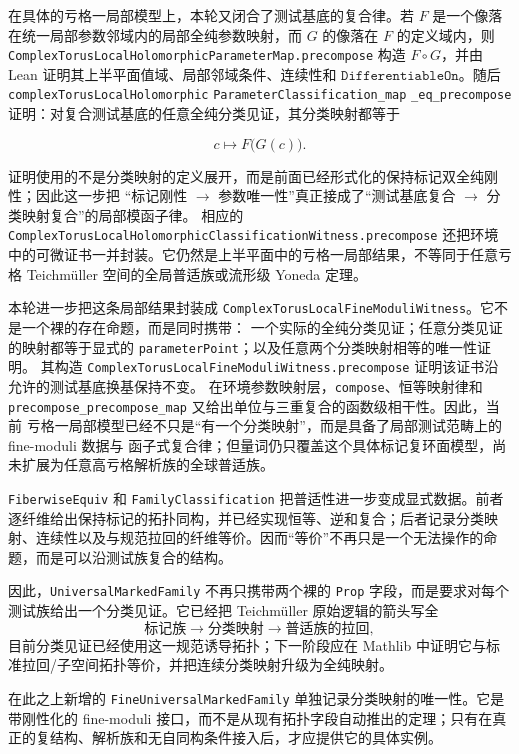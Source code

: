 \documentclass[UTF8,fontset=none,a4paper,11pt]{ctexart}
\begin{document}
在具体的亏格一局部模型上，本轮又闭合了测试基底的复合律。若
$F$ 是一个像落在统一局部参数邻域内的局部全纯参数映射，而
$G$ 的像落在 $F$ 的定义域内，则
\texttt{ComplexTorusLocalHolomorphicParameterMap.precompose} 构造
$F\circ G$，并由 Lean 证明其上半平面值域、局部邻域条件、连续性和
$\texttt{DifferentiableOn}$。随后
\texttt{complexTorusLocalHolomorphic}
\allowbreak\texttt{ParameterClassification\_map}
\allowbreak\texttt{\_eq\_precompose}
证明：对复合测试基底的任意全纯分类见证，其分类映射都等于

\[
  c\longmapsto F\bigl(G(c)\bigr).
\]

证明使用的不是分类映射的定义展开，而是前面已经形式化的保持标记双全纯刚性；因此这一步把
“标记刚性 $\to$ 参数唯一性”真正接成了“测试基底复合 $\to$ 分类映射复合”的局部模函子律。
相应的 \texttt{ComplexTorusLocalHolomorphicClassificationWitness.precompose}
还把环境中的可微证书一并封装。它仍然是上半平面中的亏格一局部结果，不等同于任意亏格
Teichmüller 空间的全局普适族或流形级 Yoneda 定理。

本轮进一步把这条局部结果封装成
\texttt{ComplexTorusLocalFineModuliWitness}。它不是一个裸的存在命题，而是同时携带：
一个实际的全纯分类见证；任意分类见证的映射都等于显式的
\texttt{parameterPoint}；以及任意两个分类映射相等的唯一性证明。
其构造
\texttt{ComplexTorusLocalFineModuliWitness.precompose} 证明该证书沿允许的测试基底换基保持不变。
在环境参数映射层，\texttt{compose}、恒等映射律和
\texttt{precompose\_precompose\_map} 又给出单位与三重复合的函数级相干性。因此，当前
亏格一局部模型已经不只是“有一个分类映射”，而是具备了局部测试范畴上的 fine-moduli 数据与
函子式复合律；但量词仍只覆盖这个具体标记复环面模型，尚未扩展为任意高亏格解析族的全球普适族。

\texttt{FiberwiseEquiv} 和 \texttt{FamilyClassification} 把普适性进一步变成显式数据。前者逐纤维给出保持标记的拓扑同构，并已经实现恒等、逆和复合；后者记录分类映射、连续性以及与规范拉回的纤维等价。因而“等价”不再只是一个无法操作的命题，而是可以沿测试族复合的结构。

因此，\texttt{UniversalMarkedFamily} 不再只携带两个裸的 \texttt{Prop} 字段，而是要求对每个测试族给出一个分类见证。它已经把 Teichmüller 原始逻辑的箭头写全
\[
  \text{标记族}\longrightarrow\text{分类映射}\longrightarrow\text{普适族的拉回},
\]
目前分类见证已经使用这一规范诱导拓扑；下一阶段应在 Mathlib 中证明它与标准拉回/子空间拓扑等价，并把连续分类映射升级为全纯映射。

在此之上新增的 \texttt{FineUniversalMarkedFamily} 单独记录分类映射的唯一性。它是带刚性化的 fine-moduli 接口，而不是从现有拓扑字段自动推出的定理；只有在真正的复结构、解析族和无自同构条件接入后，才应提供它的具体实例。
\end{document}
